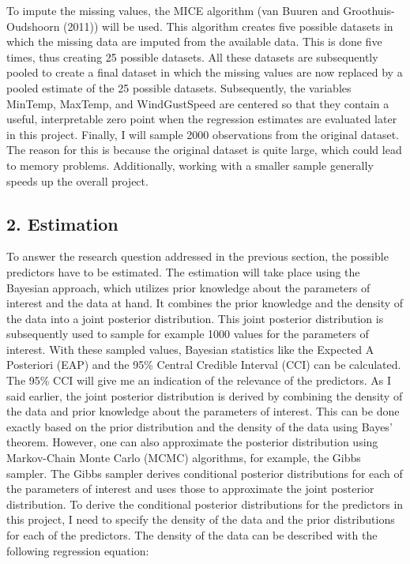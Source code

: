 \documentclass[
]{article}
\begin{document}
To impute the missing values, the MICE algorithm (van Buuren and
Groothuis-Oudshoorn (2011)) will be used. This algorithm creates five
possible datasets in which the missing data are imputed from the
available data. This is done five times, thus creating 25 possible
datasets. All these datasets are subsequently pooled to create a final
dataset in which the missing values are now replaced by a pooled
estimate of the 25 possible datasets. Subsequently, the variables
MinTemp, MaxTemp, and WindGustSpeed are centered so that they contain a
useful, interpretable zero point when the regression estimates are
evaluated later in this project. Finally, I will sample 2000
observations from the original dataset. The reason for this is because
the original dataset is quite large, which could lead to memory
problems. Additionally, working with a smaller sample generally speeds
up the overall project.

\hypertarget{estimation}{%
\subsection{2. Estimation}\label{estimation}}

To answer the research question addressed in the previous section, the
possible predictors have to be estimated. The estimation will take place
using the Bayesian approach, which utilizes prior knowledge about the
parameters of interest and the data at hand. It combines the prior
knowledge and the density of the data into a joint posterior
distribution. This joint posterior distribution is subsequently used to
sample for example 1000 values for the parameters of interest. With
these sampled values, Bayesian statistics like the Expected A Posteriori
(EAP) and the 95\% Central Credible Interval (CCI) can be calculated.
The 95\% CCI will give me an indication of the relevance of the
predictors. As I said earlier, the joint posterior distribution is
derived by combining the density of the data and prior knowledge about
the parameters of interest. This can be done exactly based on the prior
distribution and the density of the data using Bayes' theorem. However,
one can also approximate the posterior distribution using Markov-Chain
Monte Carlo (MCMC) algorithms, for example, the Gibbs sampler. The Gibbs
sampler derives conditional posterior distributions for each of the
parameters of interest and uses those to approximate the joint posterior
distribution. To derive the conditional posterior distributions for the
predictors in this project, I need to specify the density of the data
and the prior distributions for each of the predictors. The density of
the data can be described with the following regression equation:
\end{document}
